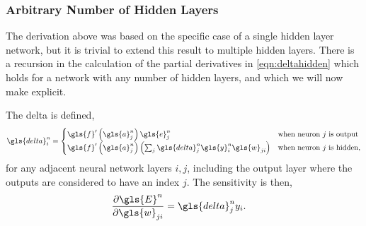 \documentclass[thesis]{subfiles}
\begin{document}
\subsubsection{Arbitrary Number of Hidden Layers}
\label{arbitraryhidden}
The derivation above was based on the specific case of a single hidden layer network, but it is trivial to extend this result to multiple hidden layers. There is a recursion in the calculation of the partial derivatives in \cref{eqn:deltahidden} which holds for a network with any number of hidden layers, and which we will now make explicit. 

The delta is defined,
\begin{equation}
\gls{delta}^n_i = \begin{cases}
        \gls{f}'\left( \gls{a}^n_j \right) \gls{e}^n_j \,& \textrm{when neuron\index{neuron} $j$ is output}\\
        \gls{f}'\left( \gls{a}^n_j \right) \left( \sum_j \gls{delta}^n_j \gls{y}^n_i \gls{w}_{ji} \right)& \textrm{when neuron\index{neuron} $j$ is hidden},
        \end{cases}
\label{eqn:fulldeltadefinition}
\end{equation}
for any adjacent neural network layers $i, j$, including the output layer where the outputs are considered to have an index $j$. The sensitivity is then, 
\begin{equation}
\begin{aligned}
    \frac{\partial \gls{E}^n}{\partial \gls{w}_{ji}} &=  \gls{delta}^n_j y_i.
     \label{eqn:sensitivity}
\end{aligned}
\end{equation}
%
\end{document}
